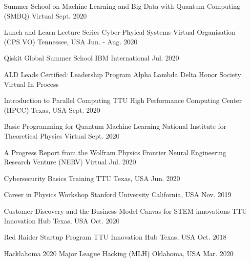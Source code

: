 

\begin{cvhonors}
    \cvhonor
    {Summer School on Machine Learning and Big Data with Quantum Computing (SMBQ)}
    {}
    {Virtual}
    {Sept. 2020}

    \cvhonor
    {Lunch and Learn Lecture Series}
    {Cyber-Phyical Systems Virtual Organisation (CPS VO) }
    {Tennessee, USA}
    {Jun. - Aug. 2020}

    \cvhonor
    {Qiskit Global Summer School}
    {IBM}
    {International}
    {Jul. 2020}

\end{cvhonors}


\begin{cvhonors}

    \cvhonor
    {ALD Leads Certified: Leadership Program}
    {Alpha Lambda Delta Honor Society}
    {Virtual}
    {In Process}

    \cvhonor
    {Introduction to Parallel Computing}
    {TTU High Performance Computing Center (HPCC)}
    {Texas, USA}
    {Sept. 2020}


    \cvhonor
    {Basic Programming for Quantum Machine Learning}
    {National Institute for Theoretical Physics}
    {Virtual}
    {Sept. 2020}

    \cvhonor
    {A Progress Report from the Wolfram Physics Frontier}
    {Neural Engineering Research Venture (NERV)}
    {}
    {Virtual}
    {Jul. 2020}

    \cvhonor
    {Cybersecurity Basics Training}
    {TTU}
    {Texas, USA}
    {Jun. 2020}

    \cvhonor
    {Career in Physics Workshop}
    {Stanford University}
    {California, USA}
    {Nov. 2019}

    \cvhonor
    {Customer Discovery and the Business Model Canvas for STEM innovations}
    {TTU Innovation Hub}
    {Texas, USA}
    {Oct. 2020}

    \cvhonor
    {Red Raider Startup Program}
    {TTU Innovation Hub}
    {Texas, USA}
    {Oct. 2018}

\end{cvhonors}



\begin{cvhonors}
    \cvhonor
    {Hacklahoma 2020}
    {Major League Hacking (MLH)}
    {Oklahoma, USA}
    {Mar. 2020}

\end{cvhonors}
